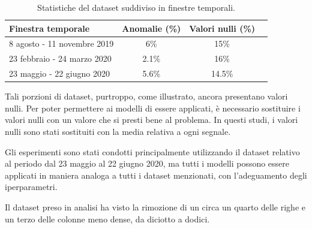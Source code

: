     \begin{table}[H]
        \centering
        \caption{Statistiche del dataset suddiviso in finestre temporali.}
        \begin{tabular}{lccc}
            \toprule
            \textbf{Finestra temporale} & \textbf{Anomalie (\%)} & \textbf{Valori nulli (\%)}  \\
            \toprule
            8 agosto - 11 novembre 2019  & 6\%   & 15\% \\
            23 febbraio - 24 marzo 2020  & 2.1\% & 16\%  \\
            23 maggio - 22 giugno 2020   & 5.6\% & 14.5\%  \\
            \bottomrule
        \end{tabular}
        \label{tab:data-info}
    \end{table}

    Tali porzioni di dataset, purtroppo, come illustrato, ancora presentano valori nulli. Per poter permettere ai modelli
    di essere applicati, è necessario sostituire i valori nulli con un valore che si presti bene al problema. In questi studi,
    i valori nulli sono stati sostituiti con la media relativa a ogni segnale. 

    Gli esperimenti sono stati condotti principalmente utilizzando il dataset relativo 
    al periodo dal 23 maggio al 22 giugno 2020, ma tutti i modelli possono essere applicati in maniera analoga a tutti 
    i dataset menzionati, con l'adeguamento degli iperparametri. 
    
    Il dataset preso in analisi ha visto la rimozione di un circa un quarto delle righe e un terzo delle 
    colonne meno dense, da diciotto a dodici.

